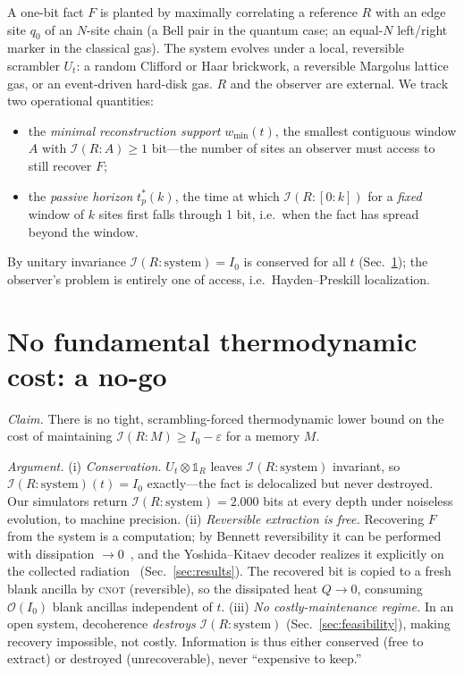 \documentclass[aps,prxquantum,twocolumn,superscriptaddress,longbibliography]{revtex4-2}
\newcommand{\I}{\mathcal{I}}
\begin{document}
A one-bit fact $F$ is planted by maximally correlating a reference $R$ with an edge site $q_{0}$ of
an $N$-site chain (a Bell pair in the quantum case; an equal-$N$ left/right marker in the classical
gas). The system evolves under a local, reversible scrambler $U_{t}$: a random Clifford or Haar
brickwork, a reversible Margolus lattice gas, or an event-driven hard-disk gas. $R$ and the
observer are external. We track two operational quantities:
\begin{itemize}
\item the \emph{minimal reconstruction support} $w_{\min}(t)$, the smallest contiguous window $A$
with $\I(R{:}A)\ge 1$ bit---the number of sites an observer must access to still recover $F$;
\item the \emph{passive horizon} $t^{*}_{p}(k)$, the time at which $\I(R{:}[0{:}k])$ for a
\emph{fixed} window of $k$ sites first falls through 1 bit, i.e.\ when the fact has spread beyond
the window.
\end{itemize}
By unitary invariance $\I(R{:}\mathrm{system})=I_{0}$ is conserved for all $t$ (Sec.~\ref{sec:nogo});
the observer's problem is entirely one of access, i.e.\ Hayden--Preskill localization.

\section{No fundamental thermodynamic cost: a no-go}
\label{sec:nogo}

\emph{Claim.} There is no tight, scrambling-forced thermodynamic lower bound on the cost of
maintaining $\I(R{:}M)\ge I_{0}-\varepsilon$ for a memory $M$.

\emph{Argument.} (i) \emph{Conservation.} $U_{t}\otimes\mathbb{1}_{R}$ leaves $\I(R{:}\mathrm{system})$
invariant, so $\I(R{:}\mathrm{system})(t)=I_{0}$ exactly---the fact is delocalized but never
destroyed. Our simulators return $\I(R{:}\mathrm{system})=2.000$ bits at every depth under noiseless
evolution, to machine precision. (ii) \emph{Reversible extraction is free.} Recovering $F$ from the
system is a computation; by Bennett reversibility it can be performed with dissipation
$\to 0$~\cite{bennett1982}, and the Yoshida--Kitaev decoder realizes it explicitly on the collected
radiation~\cite{yoshida2017} (Sec.~\ref{sec:results}). The recovered bit is copied to a fresh blank
ancilla by \textsc{cnot} (reversible), so the dissipated heat $Q\to 0$, consuming $\mathcal{O}(I_{0})$
blank ancillas independent of $t$. (iii) \emph{No costly-maintenance regime.} In an open system,
decoherence \emph{destroys} $\I(R{:}\mathrm{system})$ (Sec.~\ref{sec:feasibility}), making recovery
impossible, not costly. Information is thus either conserved (free to extract) or destroyed
(unrecoverable), never ``expensive to keep.''
\end{document}
